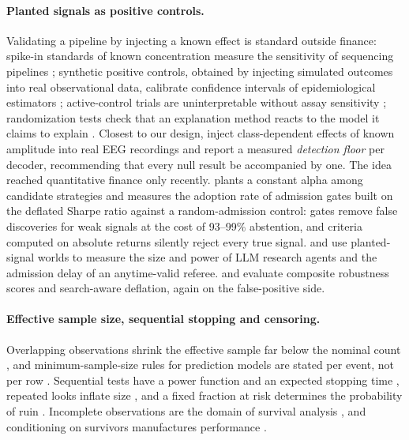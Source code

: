 \paragraph{Planted signals as positive controls.}
Validating a pipeline by injecting a known effect is standard outside finance: spike-in standards of known concentration measure the sensitivity of sequencing pipelines \citep{jiang2011}; synthetic positive controls, obtained by injecting simulated outcomes into real observational data, calibrate confidence intervals of epidemiological estimators \citep{schuemie2018}; active-control trials are uninterpretable without assay sensitivity \citep{temple2000}; randomization tests check that an explanation method reacts to the model it claims to explain \citep{adebayo2018}. Closest to our design, \citet{adeika2026} inject class-dependent effects of known amplitude into real EEG recordings and report a measured \emph{detection floor} per decoder, recommending that every null result be accompanied by one. The idea reached quantitative finance only recently. \citet{zheng2026} plants a constant alpha among candidate strategies and measures the adoption rate of admission gates built on the deflated Sharpe ratio against a random-admission control: gates remove false discoveries for weak signals at the cost of 93--99\% abstention, and criteria computed on absolute returns silently reject every true signal. \citet{liu2026} and \citet{qu2026} use planted-signal worlds to measure the size and power of LLM research agents and the admission delay of an anytime-valid referee. \citet{santoni2026} and \citet{gencay2026} evaluate composite robustness scores and search-aware deflation, again on the false-positive side.

\paragraph{Effective sample size, sequential stopping and censoring.}
Overlapping observations shrink the effective sample far below the nominal count \citep{hansen1980,boudoukh2008,lo2002}, and minimum-sample-size rules for prediction models are stated per event, not per row \citep{riley2019}. Sequential tests have a power function and an expected stopping time \citep{wald1945,doerks2026}, repeated looks inflate size \citep{armitage1969,lan1983,johari2022}, and a fixed fraction at risk determines the probability of ruin \citep{kelly1956,peters2019}. Incomplete observations are the domain of survival analysis \citep{kaplan1958}, and conditioning on survivors manufactures performance \citep{brown1992}.

